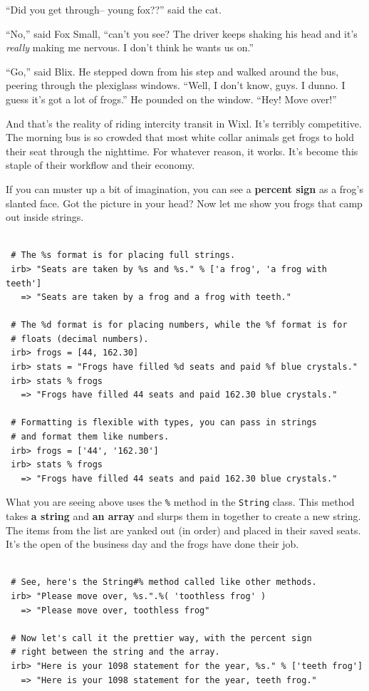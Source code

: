 \documentclass[10pt,twoside]{report}
\begin{document}
``Did you get through-- young fox??'' said the cat.

``No,'' said Fox Small, ``can't you see?  The driver keeps shaking his
        head and it's {\em really} making me nervous.  I don't think
        he wants us on.''

``Go,'' said Blix.  He stepped down from his step and walked around
        the bus, peering through the plexiglass windows.  ``Well, I
        don't know, guys.  I dunno.  I guess it's got a lot of
        frogs.''  He pounded on the window.  ``Hey!  Move over!''

And that's the reality of riding intercity transit in Wixl.  It's
terribly competitive.  The morning bus is so crowded that most white
collar animals get frogs to hold their seat through the nighttime. For
whatever reason, it works.  It's become this staple of their workflow
and their economy.

If you can muster up a bit of imagination, you can see a {\bf percent
  sign} as a frog's slanted face. Got the picture in your head?  Now
let me show you frogs that camp out inside strings.


\begin{lstlisting}

 # The %s format is for placing full strings.
 irb> "Seats are taken by %s and %s." % ['a frog', 'a frog with teeth']
   => "Seats are taken by a frog and a frog with teeth."

 # The %d format is for placing numbers, while the %f format is for
 # floats (decimal numbers).
 irb> frogs = [44, 162.30]
 irb> stats = "Frogs have filled %d seats and paid %f blue crystals."
 irb> stats % frogs
   => "Frogs have filled 44 seats and paid 162.30 blue crystals."

 # Formatting is flexible with types, you can pass in strings
 # and format them like numbers.
 irb> frogs = ['44', '162.30']
 irb> stats % frogs
   => "Frogs have filled 44 seats and paid 162.30 blue crystals."

\end{lstlisting}


What you are seeing above uses the \lstinline[breaklines=true]|%|
method in the \lstinline[breaklines=true]|String| class. This method
takes {\bf a string} and {\bf an array} and slurps them in together to
create a new string.  The items from the list are yanked out (in
order) and placed in their saved seats.  It's the open of the business
day and the frogs have done their job.


\begin{lstlisting}

 # See, here's the String#% method called like other methods.
 irb> "Please move over, %s.".%( 'toothless frog' )
   => "Please move over, toothless frog"

 # Now let's call it the prettier way, with the percent sign
 # right between the string and the array.
 irb> "Here is your 1098 statement for the year, %s." % ['teeth frog']
   => "Here is your 1098 statement for the year, teeth frog."

\end{lstlisting}
\end{document}
